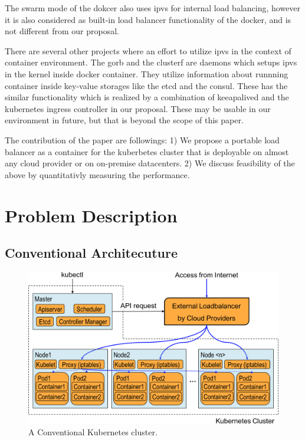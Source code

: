 The swarm mode of the dokcer\cite{DockerCoreEngineering2016,DockerInc2017} also uses ipvs for internal load balancing,
however it is also considered as built-in load balancer functionality of the docker, 
and is not different from our proposal.

There are several other projects where an effort to utilize ipvs in the context of container environment.
The gorb\cite{Sibiryov2015} and the clusterf\cite{Aaltodoc:http://urn.fi/URN:NBN:fi:aalto-201611025433} are daemons 
which setups ipvs in the kernel inside docker container. They utilize information about runnning container inside key-value storages
like the etcd\cite{CoreOSEtcd} and the consul\cite{HashiCorpConsul}. 
These has the similar functionality which is realized by a combination of keeapalived and the kubernetes ingress controller in our proposal.
These may be usable in our environment in future, but that is beyond the scope of this paper.

The contribution of the paper are followings: 
1) We propose a portable load balancer as a container for the kuberbetes cluster 
that is deployable on almost any cloud provider or on on-premise datacenters.
2) We discuss feasibility of the above by quantitativly measuring the performance.


\cite{Verma2015}
\cite{K8sExtLoadBalancer2017}

\cite{MartinA.Brown2017}

\cite{ktaka_ccmp_2017_826894}
\cite{BertHubert2002}
\cite{Glozer2016}
\cite{CoreOSFlannel}
\cite{CoreOSFlannelBackend}
\cite{TomHerbert}


\section{Problem Description}

\subsection{Conventional Architecuture}

\begin{figure}
\includegraphics[width=\columnwidth]{Figs/K8sConventional}
\caption{A Conventional Kubernetes cluster.}
\label{fig:K8sConventional}
\end{figure}

